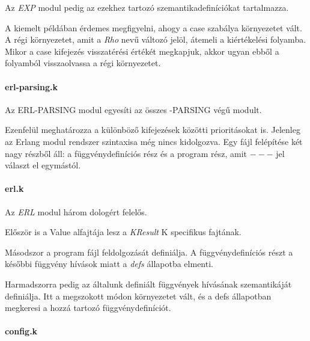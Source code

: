 

Az \textit{EXP} modul pedig az ezekhez tartozó szemantikadefiníciókat tartalmazza.



A kiemelt példában érdemes megfigyelni, ahogy a case szabálya környezetet vált. A régi környezetet, amit a \textit{Rho} nevű változó jelöl, átemeli a kiértékelési folyamba. Mikor a case kifejezés visszatérési értékét megkapjuk, akkor ugyan ebből a folyamból visszaolvassa a régi környezetet.

\paragraph{erl-parsing.k}

Az ERL-PARSING modul egyesíti az összes -PARSING végű modult.



Ezenfelül meghatározza a különböző kifejezések közötti prioritásokat is. Jelenleg az Erlang modul rendszer szintaxisa még nincs kidolgozva. Egy fájl felépítése két nagy részből áll: a függvénydefiníciós rész és a program rész, amit $---$ jel választ el egymástól.

\paragraph{erl.k}

Az \textit{ERL} modul három dologért felelős.



Először is a Value alfajtája lesz a \textit{KResult} K specifikus fajtának.



Másodszor a program fájl feldolgozását definiálja. A függvénydefiníciós részt a későbbi függvény hívások miatt a \textit{defs} állapotba elmenti.



Harmadszorra pedig az általunk definiált függvények hívásának szemantikáját definiálja. Itt a megszokott módon környezetet vált, és a defs állapotban megkeresi a hozzá tartozó függvénydefiníciót.

\paragraph{config.k}

